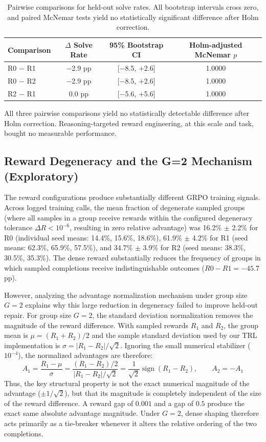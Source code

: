 \documentclass{article}
\begin{document}
\begin{table}[h]
\centering
\small
\begin{tabular}{l c c c}
\toprule
\textbf{Comparison} & \textbf{$\Delta$ Solve Rate} & \textbf{95\% Bootstrap CI} & \textbf{Holm-adjusted McNemar $p$} \\
\midrule
R0 $-$ R1 & $-$2.9 pp & [$-$8.5, $+$2.6] & 1.0000 \\
R0 $-$ R2 & $-$2.9 pp & [$-$8.5, $+$2.6] & 1.0000 \\
R2 $-$ R1 & 0.0 pp & [$-$5.6, $+$5.6] & 1.0000 \\
\bottomrule
\end{tabular}
\caption{Pairwise comparisons for held-out solve rates. All bootstrap intervals cross zero, and paired McNemar tests yield no statistically significant difference after Holm correction.}
\label{tab:pairwise}
\end{table}

All three pairwise comparisons yield no statistically detectable difference after Holm correction. Reasoning-targeted reward engineering, at this scale and task, bought no measurable performance.

\subsection{Reward Degeneracy and the G=2 Mechanism (Exploratory)}
The reward configurations produce substantially different GRPO training signals. Across logged training calls, the mean fraction of degenerate sampled groups (where all samples in a group receive rewards within the configured degeneracy tolerance $\Delta R < 10^{-6}$, resulting in zero relative advantage) was 16.2\% $\pm$ 2.2\% for R0 (individual seed means: 14.4\%, 15.6\%, 18.6\%), 61.9\% $\pm$ 4.2\% for R1 (seed means: 62.3\%, 65.9\%, 57.5\%), and 34.7\% $\pm$ 3.9\% for R2 (seed means: 38.3\%, 30.5\%, 35.3\%). The dense reward substantially reduces the frequency of groups in which sampled completions receive indistinguishable outcomes ($R0 - R1 = -45.7$ pp).

However, analyzing the advantage normalization mechanism under group size $G=2$ explains why this large reduction in degeneracy failed to improve held-out repair. For group size $G=2$, the standard deviation normalization removes the magnitude of the reward difference. With sampled rewards $R_1$ and $R_2$, the group mean is $\mu=(R_1+R_2)/2$ and the sample standard deviation used by our TRL implementation is $\sigma=|R_1-R_2|/\sqrt{2}$. Ignoring the small numerical stabilizer ($10^{-4}$), the normalized advantages are therefore:
\begin{equation}
A_1 = \frac{R_1-\mu}{\sigma} = \frac{(R_1-R_2)/2}{|R_1-R_2|/\sqrt{2}} = \frac{1}{\sqrt{2}}\operatorname{sign}(R_1-R_2), \qquad A_2 = -A_1
\end{equation}
Thus, the key structural property is not the exact numerical magnitude of the advantage ($\pm 1/\sqrt{2}$), but that its magnitude is completely independent of the size of the reward difference. A reward gap of $0.001$ and a gap of $0.5$ produce the exact same absolute advantage magnitude. Under $G=2$, dense shaping therefore acts primarily as a tie-breaker whenever it alters the relative ordering of the two completions.
\end{document}
